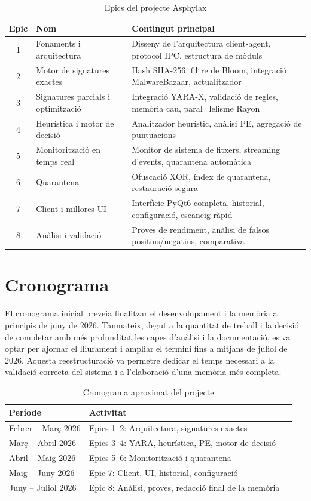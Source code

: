 \documentclass[12pt,a4paper]{report}
\begin{document}
\begin{table}[H]
\centering
\caption{Epics del projecte Asphylax}
\label{tab:epics}
\begin{tabular}{@{}clp{8cm}@{}}
\toprule
\textbf{Epic} & \textbf{Nom} & \textbf{Contingut principal} \\
\midrule
1 & Fonaments i arquitectura & Disseny de l'arquitectura client-agent, protocol IPC, estructura de mòduls \\
2 & Motor de signatures exactes & Hash SHA-256, filtre de Bloom, integració MalwareBazaar, actualitzador \\
3 & Signatures parcials i optimització & Integració YARA-X, validació de regles, memòria cau, paral·lelisme Rayon \\
4 & Heurística i motor de decisió & Analitzador heurístic, anàlisi PE, agregació de puntuacions \\
5 & Monitorització en temps real & Monitor de sistema de fitxers, streaming d'events, quarantena automàtica \\
6 & Quarantena & Ofuscació XOR, índex de quarantena, restauració segura \\
7 & Client i millores UI & Interfície PyQt6 completa, historial, configuració, escaneig ràpid \\
8 & Anàlisi i validació & Proves de rendiment, anàlisi de falsos positius/negatius, comparativa \\
\bottomrule
\end{tabular}
\end{table}

\section{Cronograma}
El cronograma inicial preveia finalitzar el desenvolupament i la memòria a principis de juny de 2026. Tanmateix, degut a la quantitat de treball i la decisió de completar amb més profunditat les capes d'anàlisi i la documentació, es va optar per ajornar el lliurament i ampliar el termini fins a mitjans de juliol de 2026. Aquesta reestructuració va permetre dedicar el temps necessari a la validació correcta del sistema i a l'elaboració d'una memòria més completa.

\begin{table}[H]
\centering
\caption{Cronograma aproximat del projecte}
\label{tab:cronograma}
\begin{tabular}{@{}lll@{}}
\toprule
\textbf{Període} & \textbf{Activitat} \\
\midrule
Febrer -- Març 2026   & Epics 1--2: Arquitectura, signatures exactes \\
Març -- Abril 2026    & Epics 3--4: YARA, heurística, PE, motor de decisió \\
Abril -- Maig 2026    & Epics 5--6: Monitorització i quarantena \\
Maig -- Juny 2026     & Epic 7: Client, UI, historial, configuració \\
Juny -- Juliol 2026   & Epic 8: Anàlisi, proves, redacció final de la memòria \\
\bottomrule
\end{tabular}
\end{table}
\end{document}
